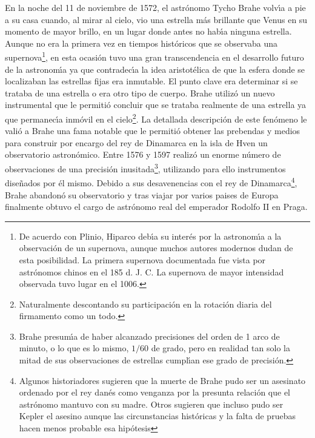 En la noche del 11 de noviembre de 1572, el astr\'onomo Tycho Brahe  volv\'\i{}a a pie a su casa cuando, al mirar al cielo, vio una estrella m\'as brillante que Venus en su momento de mayor brillo, en un lugar donde antes no hab\'\i{}a ninguna estrella. Aunque no era la primera vez en tiempos hist\'oricos que se observaba una supernova\footnote{De acuerdo con Plinio, Hiparco deb\'\i{}a su inter\'es por la astronom\'\i{}a a la observaci\'on de un supernova, aunque muchos autores modernos dudan de esta posibilidad. La primera supernova documentada fue vista por astr\'onomos chinos en el 185 d. J. C.  La supernova de mayor intensidad observada tuvo lugar en el 1006. }, en esta ocasi\'on tuvo una gran transcendencia en el desarrollo futuro de la astronom\'\i{}a ya que contradec\'\i{}a la idea aristot\'elica de que la esfera donde se localizaban las estrellas fijas era inmutable. El punto clave era determinar si se trataba de una estrella  o era otro tipo de cuerpo.  Brahe utiliz\'o un nuevo instrumental que le permiti\'o concluir que se trataba realmente de una estrella ya que permanec\'\i{}a inm\'ovil en el cielo\footnote{Naturalmente descontando su participaci\'on en la rotaci\'on diaria del firmamento como un todo.}. La detallada descripci\'on de este fen\'omeno le vali\'o a Brahe una fama notable que le permiti\'o obtener las prebendas y medios para construir por encargo del rey de Dinamarca en la isla de Hven un observatorio astron\'omico. Entre 1576 y 1597 realiz\'o un enorme n\'umero de observaciones de una precisi\'on inusitada\footnote{Brahe presum\'\i{}a de haber alcanzado precisiones del orden de 1 arco de minuto, o lo que es lo mismo, \(1/60\) de grado, pero en realidad tan solo la mitad de sus observaciones de estrellas cumpl\'\i{}an ese grado de precisi\'on.}, utilizando para ello instrumentos dise\~{n}ados por \'el mismo.
%
%
Debido a sus desavenencias con el rey de Dinamarca\footnote{Algunos historiadores sugieren que la muerte de Brahe pudo ser un asesinato ordenado por el rey dan\'es como venganza por la presunta relaci\'on que el astr\'onomo mantuvo con su madre. Otros sugieren que incluso pudo ser Kepler el asesino aunque las circunstancias hist\'oricas y la falta de pruebas hacen menos probable esa hip\'otesis }, Brahe abandon\'o su observatorio y tras viajar por varios paises de Europa finalmente obtuvo el cargo de astr\'onomo real del emperador Rodolfo II en Praga. 

